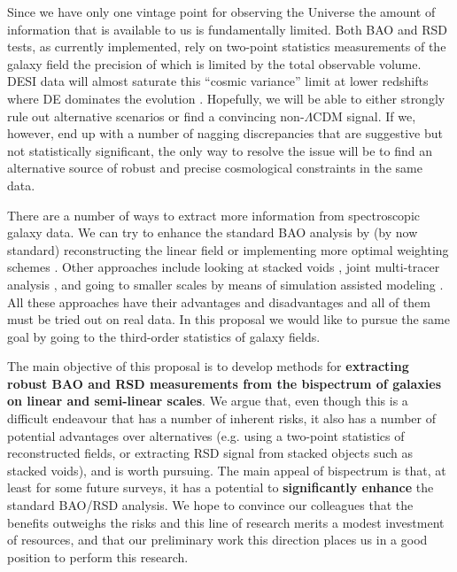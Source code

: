 Since we have only one vintage point for observing the Universe the amount of
information that is  available to us is fundamentally limited. Both BAO and RSD
tests, as currently implemented, rely on two-point statistics measurements of
the galaxy field the precision of which is limited by the total  observable
volume.  DESI data will almost saturate this ``cosmic variance'' limit
at lower redshifts where DE dominates the evolution \cite{2014JCAP...05..023F}. Hopefully, we will be able
to either strongly rule out alternative scenarios or find a convincing
non-$\Lambda$CDM signal. If we, however, end up with a number of nagging
discrepancies that are suggestive but not statistically significant, the only
way to resolve the issue will be to find an alternative source of robust and
precise cosmological constraints in the same data.

There are a number of ways to extract more information from spectroscopic
galaxy data. We can try to enhance the standard BAO analysis by (by now
standard) reconstructing the linear field
\cite{2007ApJ...664..675E,2009PhRvD..79f3523P,2009PhRvD..80l3501N,2012MNRAS.427.2132P}
or implementing more optimal weighting schemes
\cite{2016MNRAS.463.2708P,2015MNRAS.451..236Z,2017MNRAS.464.2698R}. Other
approaches include looking at stacked voids
\cite{2013MNRAS.436.3480P,2015MNRAS.451.1036C,2015JCAP...11..036H,2016PhRvL.117i1302H,2016MNRAS.462.2465C,2017JCAP...07..014H},
joint multi-tracer analysis
\cite{2009PhRvL.102b1302S,2009PhRvL.103i1303S,2009JCAP...10..007M}, and going
to smaller scales by means of simulation assisted modeling
\cite{2014MNRAS.444..476R,2015ApJ...810...35K,2018arXiv180405867Z}.  All these
approaches have their advantages and disadvantages and all of them must be
tried out on real data. In this proposal we would like to pursue the same goal
by going to the third-order statistics of galaxy fields.

The main objective of this proposal is to develop methods for
\textbf{extracting robust BAO and RSD measurements from the  bispectrum of
galaxies on linear and semi-linear scales}. We argue that, even though this is
a difficult  endeavour that has a number of inherent risks, it also has a
number of potential advantages over alternatives (e.g.  using a two-point
statistics of reconstructed fields, or extracting RSD signal from stacked
objects such as stacked voids), and is worth pursuing. The main appeal of
bispectrum is that, at least for some future surveys, it has a potential to
\textbf{significantly enhance} the standard BAO/RSD analysis. We hope to
convince our colleagues that the benefits outweighs the risks and this line of
research merits a modest investment of resources, and that our preliminary work
this direction places us in a good position  to perform this research. 

